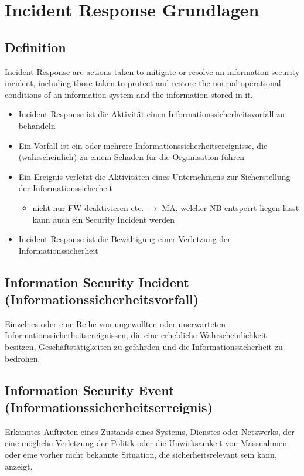 
\section{Incident Response Grundlagen}

\subsection{Definition}
Incident Response are actions taken to mitigate or resolve an information security incident, including those taken to protect and restore the normal operational conditions of an information system and the information stored in it.

\begin{itemize}
    \item Incident Response ist die Aktivität einen Informationssicherheitsvorfall zu behandeln
    \item Ein Vorfall ist ein oder mehrere Informationssicherheitsereignisse, die (wahrscheinlich) zu einem Schaden für die Organisation führen
    \item Ein Ereignis verletzt die Aktivitäten eines Unternehmens zur Sicherstellung der Informationssicherheit
    \begin{itemize}
        \item nicht nur FW deaktivieren etc. $\rightarrow$ MA, welcher NB entsperrt liegen lässt kann auch ein Security Incident werden
    \end{itemize}
    \item Incident Response ist die Bewältigung einer Verletzung der Informationssicherheit
\end{itemize}

\subsection{Information Security Incident (Informationssicherheitsvorfall)}
Einzelnes oder eine Reihe von ungewollten oder unerwarteten Informationssicherheitsereignissen, die eine erhebliche Wahrscheinlichkeit besitzen, Geschäftstätigkeiten zu gefährden und die Informationssicherheit zu bedrohen.

\subsection{Information Security Event (Informationssicherheitserreignis)}
Erkanntes Auftreten eines Zustands eines Systems, Dienstes oder Netzwerks, der eine mögliche Verletzung der Politik oder die Unwirksamkeit von Massnahmen oder eine vorher nicht bekannte Situation, die sicherheitsrelevant sein kann, anzeigt.

